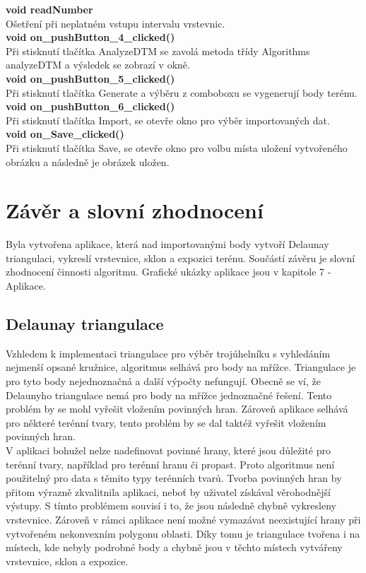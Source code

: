 \documentclass[a4paper, 12pt]{article}
\begin{document}
\textbf{void readNumber}\\
Ošetření při neplatném vstupu intervalu vrstevnic.
\\

\textbf{void on\_pushButton\_4\_clicked()}\\
Při stisknutí tlačítka AnalyzeDTM se zavolá metoda třídy Algorithms analyzeDTM a výsledek se zobrazí v okně.
\\

\textbf{void on\_pushButton\_5\_clicked()}\\
Při stisknutí tlačítka Generate a výběru z comboboxu se vygenerují body terénu.
\\

\textbf{void on\_pushButton\_6\_clicked()}\\
Při stisknutí tlačítka Import, se otevře okno pro výběr importovaných dat.
\\

\textbf{void on\_Save\_clicked()}\\
Při stisknutí tlačítka Save, se otevře okno pro volbu místa uložení vytvořeného obrázku a následně je obrázek uložen.
\\


\clearpage
\section{Závěr a slovní zhodnocení}
Byla vytvořena aplikace, která nad importovanými body vytvoří Delaunay triangulaci, vykreslí vrstevnice, sklon a expozici terénu. Součástí závěru je slovní zhodnocení činnosti algoritmu. Grafické ukázky aplikace jsou v kapitole 7 - Aplikace. \\

\subsection{Delaunay triangulace}
Vzhledem k implementaci triangulace pro výběr trojúhelníku s vyhledáním nejmenší opsané kružnice, algoritmus selhává pro body na mřížce. Triangulace je pro tyto body nejednoznačná a další výpočty nefungují. Obecně se ví, že Delaunyho triangulace nemá pro body na mřížce jednoznačné řešení. Tento problém by se mohl vyřešit vložením povinných hran. Zároveň aplikace selhává pro některé terénní tvary, tento problém by se dal taktéž vyřešit vložením povinných hran. \\

V aplikaci bohužel nelze nadefinovat povinné hrany, které jsou důležité pro terénní tvary, například pro terénní hranu či propast. Proto algoritmus není použitelný pro data s těmito typy terénních tvarů. Tvorba povinných hran by přitom výrazně zkvalitnila aplikaci, neboť by uživatel získával věrohodnější výstupy. S tímto problémem souvisí i to, že jsou následně chybně vykresleny vrstevnice. Zároveň v rámci aplikace není možné vymazávat neexistující hrany při vytvořeném nekonvexním polygonu oblasti. Díky tomu je triangulace tvořena i na místech, kde nebyly podrobné body a chybně jsou v těchto místech vytvářeny vrstevnice, sklon a expozice. \\
\end{document}
